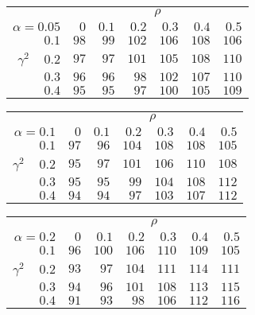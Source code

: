 \begin{tabular}{r|rrrrrr}
\hline\hline
 &\multicolumn{6}{c}{$\rho$} \\ 
 $\alpha = 0.05$ & $0$ & $0.1$ & $0.2$ & $0.3$ & $0.4$ & $0.5$ \\ 
 \hline$0.1$ & $ 98$ & $ 99$ & $102$ & $106$ & $108$ & $106$\\ 
$\gamma^2\;\;\;$ $0.2$ & $ 97$ & $ 97$ & $101$ & $105$ & $108$ & $110$\\ 
$0.3$ & $ 96$ & $ 96$ & $ 98$ & $102$ & $107$ & $110$\\ 
$0.4$ & $ 95$ & $ 95$ & $ 97$ & $100$ & $105$ & $109$\\ 
 \hline 
 \end{tabular}
 
 \vspace{2em} 
 
\begin{tabular}{r|rrrrrr}
\hline\hline
 &\multicolumn{6}{c}{$\rho$} \\ 
 $\alpha = 0.1$ & $0$ & $0.1$ & $0.2$ & $0.3$ & $0.4$ & $0.5$ \\ 
 \hline$0.1$ & $ 97$ & $ 96$ & $104$ & $108$ & $108$ & $105$\\ 
$\gamma^2\;\;\;$ $0.2$ & $ 95$ & $ 97$ & $101$ & $106$ & $110$ & $108$\\ 
$0.3$ & $ 95$ & $ 95$ & $ 99$ & $104$ & $108$ & $112$\\ 
$0.4$ & $ 94$ & $ 94$ & $ 97$ & $103$ & $107$ & $112$\\ 
 \hline 
 \end{tabular}
 
 \vspace{2em} 
 
\begin{tabular}{r|rrrrrr}
\hline\hline
 &\multicolumn{6}{c}{$\rho$} \\ 
 $\alpha = 0.2$ & $0$ & $0.1$ & $0.2$ & $0.3$ & $0.4$ & $0.5$ \\ 
 \hline$0.1$ & $ 96$ & $100$ & $106$ & $110$ & $109$ & $105$\\ 
$\gamma^2\;\;\;$ $0.2$ & $ 93$ & $ 97$ & $104$ & $111$ & $114$ & $111$\\ 
$0.3$ & $ 94$ & $ 96$ & $101$ & $108$ & $113$ & $115$\\ 
$0.4$ & $ 91$ & $ 93$ & $ 98$ & $106$ & $112$ & $116$\\ 
 \hline 
 \end{tabular}